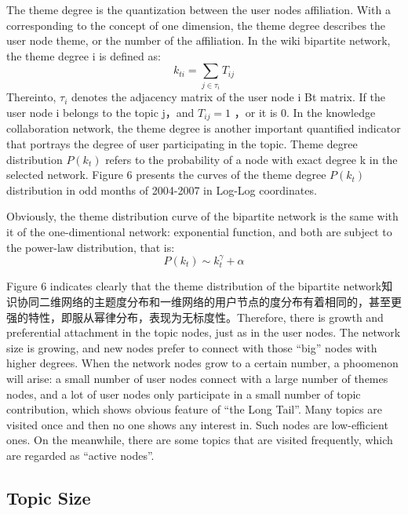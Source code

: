 \documentclass{elsarticle}
\begin{document}
The theme degree is the quantization between the user nodes
affiliation. With a corresponding to the concept of one dimension, the
theme degree describes the user node theme, or the number of the
affiliation. In the wiki bipartite network, the theme degree i is
defined as:
\begin{equation}
  \label{eq:1}
  k_{ti}=\sum_{j \in \tau_i} T_{ij}
\end{equation}
Thereinto, $\tau_i$ denotes the adjacency matrix of the user node i Bt
matrix. If the user node i belongs to the topic j，and $T_{ij}=1$ ，or
it is 0. In the knowledge collaboration network, the theme degree is
another important quantified indicator that portrays the degree of
user participating in the topic. Theme degree distribution $P(k_t)$
refers to the probability of a node with exact degree k in the
selected network. Figure 6 presents the curves of the theme degree
$P(k_t)$  distribution  in odd months of 2004-2007 in Log-Log
coordinates. 

Obviously, the theme distribution curve of the bipartite network is the same with it of the one-dimentional network: exponential function, and both are subject to the power-law distribution, that is: 
\begin{equation}
  \label{eq:2}
  P(k_t)\sim k_t^{\gamma}+\alpha
\end{equation}

Figure 6 indicates clearly that the theme distribution of the bipartite network知识协同二维网络的主题度分布和一维网络的用户节点的度分布有着相同的，甚至更强的特性，即服从幂律分布，表现为无标度性。Therefore, there is growth and preferential attachment in the topic nodes, just as in the user nodes. The network size is growing, and new nodes prefer to connect with those “big” nodes with higher degrees. When the network nodes grow to a certain number, a phoomenon will arise: a small number of user nodes connect with a large number of themes nodes, and a lot of user nodes only participate in a small number of topic contribution, which shows obvious feature of “the Long Tail”. Many topics are visited once and then no one shows any interest in. Such nodes are low-efficient ones. On the meanwhile, there are some topics that are visited frequently, which are regarded as “active nodes”. 

\subsection{Topic Size}
\label{sec:topic-size}
\end{document}
